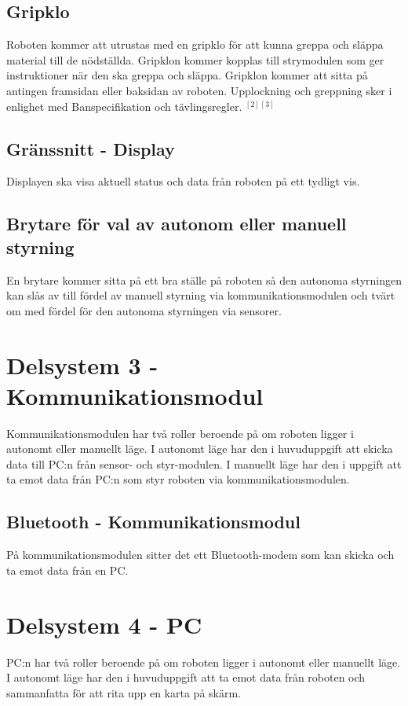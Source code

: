 \documentclass[11pt]{article}
\begin{document}
\begin{flushleft}
\subsection{Gripklo}
Roboten kommer att utrustas med en gripklo för att kunna greppa och släppa material till de nödställda. Gripklon kommer kopplas till strymodulen som ger instruktioner när den ska greppa och släppa. Gripklon kommer att sitta på antingen framsidan eller baksidan av roboten. Upplockning och greppning sker i enlighet med Banspecifikation och tävlingsregler. $^{[2]}$$^{[3]}$

\subsection{Gränssnitt - Display}
Displayen ska visa aktuell status och data från roboten på ett tydligt vis.

\subsection{Brytare för val av autonom eller manuell styrning}
En brytare kommer sitta på ett bra ställe på roboten så den autonoma styrningen kan slås av till fördel av manuell styrning via kommunikationsmodulen och tvärt om med fördel för den autonoma styrningen via sensorer.

\section{Delsystem 3 - Kommunikationsmodul}
Kommunikationsmodulen har två roller beroende på om roboten ligger i autonomt eller manuellt läge. I autonomt läge har den i huvuduppgift att skicka data till PC:n från sensor- och styr-modulen. I manuellt läge har den i uppgift att ta emot data från PC:n som styr roboten via kommunikationsmodulen.

\subsection{Bluetooth - Kommunikationsmodul}
På kommunikationsmodulen sitter det ett Bluetooth-modem som kan skicka och ta emot data från en PC.  

\section{Delsystem 4 - PC}
PC:n har två roller  beroende på om roboten ligger i autonomt eller manuellt läge. I autonomt läge har den i huvuduppgift att ta emot data från roboten och sammanfatta för att rita upp en karta på skärm.


\end{flushleft}
\end{document}
